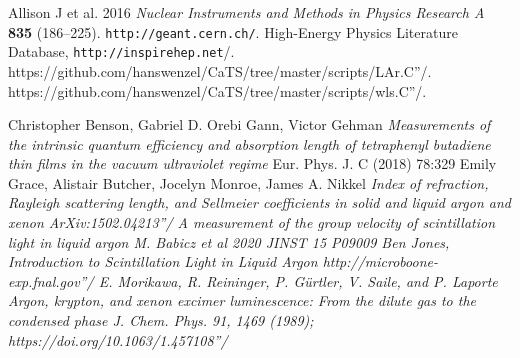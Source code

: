 \documentclass[a4paper]{jpconf}
\begin{document}
\begin{thebibliography}{99}
 Allison J et al. 2016 {\it Nuclear Instruments and Methods in Physics
                Research A} {\bf 835} (186--225).
 \verb|http://geant.cern.ch/|.
 High-Energy Physics Literature Database,
  \verb"http://inspirehep.net"/.
  \verb''https://github.com/hanswenzel/CaTS/tree/master/scripts/LAr.C''/.
  \verb''https://github.com/hanswenzel/CaTS/tree/master/scripts/wls.C''/.

 Christopher Benson, Gabriel D. Orebi Gann, Victor Gehman
  {\it Measurements of the intrinsic quantum efficiency and absorption
      length of tetraphenyl butadiene thin films in the vacuum
      ultraviolet regime}
Eur. Phys. J. C (2018) 78:329
Emily Grace, Alistair Butcher, Jocelyn Monroe, James A. Nikkel
  \it{Index of refraction, Rayleigh scattering length, and Sellmeier coefficients in solid and liquid argon and xenon}
  \verb'' ArXiv:1502.04213''/
  \it{A measurement of the group velocity of scintillation light in liquid argon}
  M. Babicz et al 2020 JINST 15 P09009
  Ben Jones, \it{Introduction to Scintillation Light in Liquid Argon}
  \verb''http://microboone-exp.fnal.gov''/
  E. Morikawa, R. Reininger, P. Gürtler, V. Saile, and P. Laporte
\it{Argon, krypton, and xenon excimer luminescence: From the dilute gas to the
condensed phase}
J. Chem. Phys. 91, 1469 (1989);
  \verb''https://doi.org/10.1063/1.457108''/


  
\end{thebibliography}
\end{document}
